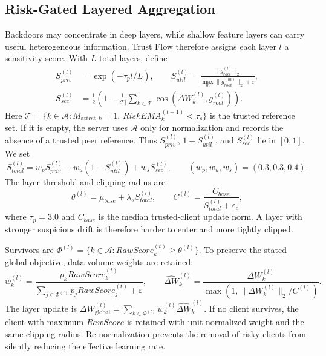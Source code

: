 \documentclass[11pt, a4paper]{article}
\begin{document}
\subsection{Risk-Gated Layered Aggregation}
Backdoors may concentrate in deep layers, while shallow feature layers can
carry useful heterogeneous information. Trust Flow therefore assigns each
layer $l$ a sensitivity score. With $L$ total layers, define
\begin{align}
    S_{priv}^{(l)}&=\exp(-\tau_p l/L),\qquad
    S_{util}^{(l)}=\frac{\|g_{root}^{(l)}\|_2}
    {\max_m\|g_{root}^{(m)}\|_2+\varepsilon},\\
    S_{sec}^{(l)}&=\frac{1}{2}\left(1-\frac{1}{|\mathcal{T}|}
    \sum_{k\in\mathcal{T}}\cos(\Delta W_k^{(l)},g_{root}^{(l)})\right).
\end{align}
Here
$\mathcal{T}=\{k\in\mathcal{A}:M_{\mathrm{attest},k}=1,\,
RiskEMA_k^{(t-1)}<\tau_s\}$ is the trusted reference set. If it is empty, the
server uses $\mathcal{A}$ only for normalization and records the absence of a
trusted peer reference. Thus $S_{priv}^{(l)}$, $1-S_{util}^{(l)}$, and
$S_{sec}^{(l)}$ lie in $[0,1]$. We set
\begin{equation}
    S_{total}^{(l)}=w_pS_{priv}^{(l)}+w_u(1-S_{util}^{(l)})
    +w_sS_{sec}^{(l)},\qquad (w_p,w_u,w_s)=(0.3,0.3,0.4).
\end{equation}
The layer threshold and clipping radius are
\begin{equation}
    \theta^{(l)}=\mu_{base}+\lambda_sS_{total}^{(l)},\qquad
    C^{(l)}=\frac{C_{base}}{S_{total}^{(l)}+\varepsilon_c},
\end{equation}
where $\tau_p=3.0$ and $C_{base}$ is the median trusted-client update norm.
A layer with stronger suspicious drift is therefore harder to enter and more
tightly clipped.

Survivors are
$\Phi^{(l)}=\{k\in\mathcal{A}:RawScore_k^{(t)}\geq\theta^{(l)}\}$. To preserve
the stated global objective, data-volume weights are retained:
\begin{equation}
    \tilde{w}_k^{(l)}=
    \frac{p_kRawScore_k^{(t)}}{\sum_{j\in\Phi^{(l)}}p_jRawScore_j^{(t)}
    +\varepsilon},\qquad
    \widehat{\Delta W}_k^{(l)}=
    \frac{\Delta W_k^{(l)}}{\max(1,\|\Delta W_k^{(l)}\|_2/C^{(l)})}.
\end{equation}
The layer update is
$\Delta W_{\mathrm{global}}^{(l)}
=\sum_{k\in\Phi^{(l)}}\tilde{w}_k^{(l)}
\widehat{\Delta W}_k^{(l)}$. If no client survives, the client with maximum
$RawScore$ is retained with unit normalized weight and the same clipping radius.
Re-normalization prevents the removal of risky clients from silently reducing
the effective learning rate.
\end{document}

